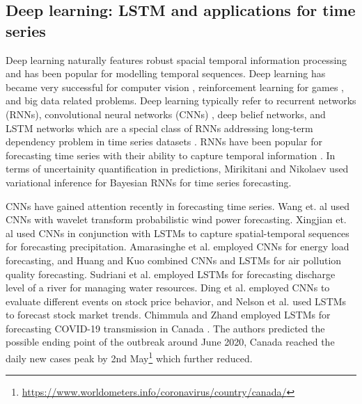 \documentclass[final,5p,times,twocolumn]{elsarticle}
\begin{document}
 








\subsection{Deep learning: LSTM and  applications for time series }


Deep learning naturally features robust spacial temporal information processing \cite{lecun2015deep,schmidhuber2015deep} and has been popular for modelling temporal sequences. Deep learning has  became very successful for computer vision \cite{he2016deep}, reinforcement learning for games \cite{mnih2013playing}, and big data related problems. Deep learning typically refer to recurrent networks (RNNs), convolutional neural networks (CNNs) \cite{najafabadi2015deep,mnih2013playing}, deep belief networks, and LSTM networks which are a special class of RNNs addressing long-term dependency problem in time series datasets \cite{schmidhuber2015deep}. RNNs   have been popular for forecasting time series with their ability to capture temporal information \cite{connor1994recurrent,husken2003recurrent, chandra2012cooperative,chandra2015competition,SALINAS2020}.  In terms of uncertainity quantification in predictions, Mirikitani and Nikolaev   used \cite{mirikitani2010recursive}  variational  inference  for Bayesian RNNs for time series forecasting. 

CNNs have gained attention recently in  forecasting time series. Wang et. al  \cite{wang2017deep}  used CNNs with  wavelet transform   probabilistic wind power forecasting. Xingjian et. al   \cite{xingjian2015convolutional} used   CNNs  in conjunction with LSTMs to capture spatial-temporal sequences   for forecasting precipitation. Amarasinghe et al. \cite{Amarasinghe2017Deepelf} employed  CNNs for   energy load forecasting, and  Huang and Kuo \cite{Huang2018CNN-LSTM} combined CNNs and LSTMs for air pollution quality forecasting. Sudriani et al. \cite{sudriani2019long} employed  LSTMs for forecasting discharge level of a river for  managing water resources. Ding et al. \cite{Ding2015} employed  CNNs to evaluate   different events on stock price behavior,  and  Nelson et al. \cite{nelson2017stock} used LSTMs to forecast stock market trends. Chimmula and Zhand  employed LSTMs for forecasting COVID-19 transmission in Canada  \cite{CHIMMULA2020}. The authors  predicted the possible ending point of the  outbreak   around June 2020, Canada reached the daily new cases peak by 2nd May\footnote{\url{https://www.worldometers.info/coronavirus/country/canada/}} which further reduced. 
\end{document}
